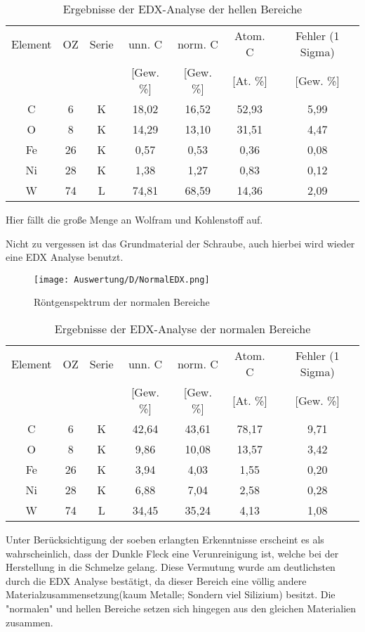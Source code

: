 \begin{table}[h]
    \centering
    \begin{tabular}{c|c|c|c|c|c|c}
        Element & OZ &Serie& unn. C & norm. C &  Atom. C  & Fehler (1 Sigma) \\
         & & & [Gew. \%] & [Gew. \%] & [At. \%] & [Gew. \%] \\
        \hline\hline
        C & 6 & K & 18,02 & 16,52 & 52,93 & 5,99\\
        O & 8 & K & 14,29 & 13,10 & 31,51 & 4,47\\
        Fe & 26 & K & 0,57 & 0,53 & 0,36 & 0,08\\
        Ni & 28 & K & 1,38 & 1,27 & 0,83 & 0,12\\
        W & 74 & L & 74,81 & 68,59 & 14,36 & 2,09
    \end{tabular}
    \caption{Ergebnisse der EDX-Analyse der hellen Bereiche}
\end{table}
Hier fällt die große Menge an Wolfram und Kohlenstoff auf.

\newpage
Nicht zu vergessen ist das Grundmaterial der Schraube, auch hierbei wird wieder eine EDX Analyse benutzt.
\begin{figure}[h]
    \centering
    \texttt{[image: Auswertung/D/NormalEDX.png]}
    \caption{Röntgenspektrum der normalen Bereiche}
\end{figure}


\begin{table}[h]
    \centering
    \begin{tabular}{c|c|c|c|c|c|c}
        Element & OZ &Serie& unn. C & norm. C &  Atom. C  & Fehler (1 Sigma) \\
         & & & [Gew. \%] & [Gew. \%] & [At. \%] & [Gew. \%] \\
        \hline\hline
        C & 6 & K & 42,64 & 43,61 & 78,17 & 9,71\\
        O & 8 & K & 9,86 & 10,08 & 13,57 & 3,42\\
        Fe & 26 & K & 3,94 & 4,03 & 1,55 & 0,20\\
        Ni & 28 & K & 6,88 & 7,04 & 2,58 & 0,28\\
        W & 74 & L & 34,45 & 35,24 & 4,13 & 1,08
    \end{tabular}
    \caption{Ergebnisse der EDX-Analyse der normalen Bereiche}
\end{table}

Unter Berücksichtigung der soeben erlangten Erkenntnisse erscheint es als wahrscheinlich, dass der Dunkle Fleck eine Verunreinigung ist, welche bei der Herstellung in die Schmelze gelang. Diese Vermutung wurde am deutlichsten durch die EDX Analyse bestätigt, da dieser Bereich eine völlig andere Materialzusammensetzung(kaum Metalle; Sondern viel Silizium) besitzt. Die "normalen" und hellen Bereiche setzen sich hingegen aus den gleichen Materialien zusammen. \\

